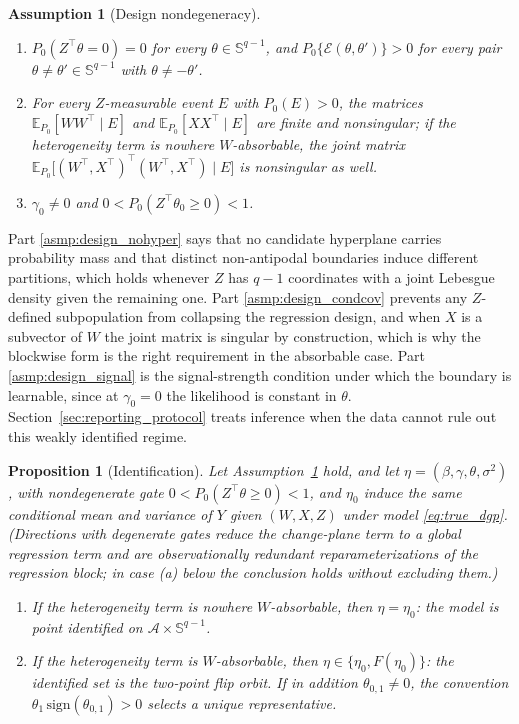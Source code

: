 \documentclass[11pt]{article}
\newtheorem{assumption}{Assumption}
\newtheorem{proposition}{Proposition}
\theoremstyle{definition}
\theoremstyle{plain}
\newcommand{\E}{\mathbb{E}}
\begin{document}
\begin{assumption}[Design nondegeneracy]\label{asmp:design}
\leavevmode
\begin{enumerate}[label=(\roman*),nosep]
\item\label{asmp:design_nohyper} $P_0(Z^\top\theta=0)=0$ for every $\theta\in\mathbb S^{q-1}$, and $P_0\{\mathcal E(\theta,\theta')\}>0$ for every pair $\theta\neq\theta'\in\mathbb S^{q-1}$ with $\theta\ne-\theta'$.
\item\label{asmp:design_condcov} For every $Z$-measurable event $E$ with $P_0(E)>0$, the matrices $\E_{P_0}[WW^\top\mid E]$ and $\E_{P_0}[XX^\top\mid E]$ are finite and nonsingular; if the heterogeneity term is nowhere $W$-absorbable, the joint matrix $\E_{P_0}\big[(W^\top,X^\top)^\top(W^\top,X^\top)\mid E\big]$ is nonsingular as well.
\item\label{asmp:design_signal} $\gamma_0\neq0$ and $0<P_0(Z^\top\theta_0\ge0)<1$.
\end{enumerate}
\end{assumption}

Part \ref{asmp:design_nohyper} says that no candidate hyperplane carries probability mass and that distinct non-antipodal boundaries induce different partitions, which holds whenever $Z$ has $q-1$ coordinates with a joint Lebesgue density given the remaining one. Part \ref{asmp:design_condcov} prevents any $Z$-defined subpopulation from collapsing the regression design, and when $X$ is a subvector of $W$ the joint matrix is singular by construction, which is why the blockwise form is the right requirement in the absorbable case. Part \ref{asmp:design_signal} is the signal-strength condition under which the boundary is learnable, since at $\gamma_0=0$ the likelihood is constant in $\theta$. Section~\ref{sec:reporting_protocol} treats inference when the data cannot rule out this weakly identified regime.

\begin{proposition}[Identification]\label{prop:identification}
Let Assumption~\ref{asmp:design} hold, and let $\eta=(\beta,\gamma,\theta,\sigma^2)$, with nondegenerate gate $0<P_0(Z^\top\theta\ge0)<1$, and $\eta_0$ induce the same conditional mean and variance of $Y$ given $(W,X,Z)$ under model \eqref{eq:true_dgp}. (Directions with degenerate gates reduce the change-plane term to a global regression term and are observationally redundant reparameterizations of the regression block; in case (a) below the conclusion holds without excluding them.)
\begin{enumerate}[label=(\alph*),nosep]
\item If the heterogeneity term is nowhere $W$-absorbable, then $\eta=\eta_0$: the model is point identified on $\mathcal A\times\mathbb S^{q-1}$.
\item If the heterogeneity term is $W$-absorbable, then $\eta\in\{\eta_0,F(\eta_0)\}$: the identified set is the two-point flip orbit. If in addition $\theta_{0,1}\neq0$, the convention $\theta_1\,\mathrm{sign}(\theta_{0,1})>0$ selects a unique representative.
\end{enumerate}
\end{proposition}
\end{document}
